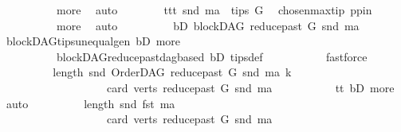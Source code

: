 \begin{isabellebody}
\ \ \ \ \ \ \ \ \ \ more\ \isamarkupfalse%
\ auto\isanewline
\ \ \ \ \ \ \isamarkupfalse%
\ ttt{\isacharcolon}{\kern0pt}\ {\isachardoublequoteopen}snd\ ma\ {\isasymin}\ tips\ G{\isachardoublequoteclose}\ \isamarkupfalse%
\ chosen{\isacharunderscore}{\kern0pt}max{\isacharunderscore}{\kern0pt}tip{\isacharparenleft}{\kern0pt}{}{\isacharparenright}{\kern0pt}\ pp{\isacharunderscore}{\kern0pt}in\isanewline
\ \ \ \ \ \ \ \ \ \ more\ \isamarkupfalse%
\ auto\isanewline
\ \ \ \ \ \ \isamarkupfalse%
\ \isamarkupfalse%
\ bD{}{\isacharcolon}{\kern0pt}\ {\isachardoublequoteopen}blockDAG\ {\isacharparenleft}{\kern0pt}reduce{\isacharunderscore}{\kern0pt}past\ G\ {\isacharparenleft}{\kern0pt}snd\ ma{\isacharparenright}{\kern0pt}{\isacharparenright}{\kern0pt}{\isachardoublequoteclose}\ \isamarkupfalse%
\ blockDAG{\isachardot}{\kern0pt}tips{\isacharunderscore}{\kern0pt}unequal{\isacharunderscore}{\kern0pt}gen\ bD\ more\ \isanewline
\ \ \ \ \ \ \ \ \ \ blockDAG{\isachardot}{\kern0pt}reduce{\isacharunderscore}{\kern0pt}past{\isacharunderscore}{\kern0pt}dagbased\ bD\ tips{\isacharunderscore}{\kern0pt}def\ \isanewline
\ \ \ \ \ \ \ \ \isamarkupfalse%
\ fastforce\isanewline
\ \ \ \ \ \ \isamarkupfalse%
\ \isamarkupfalse%
\ {\isachardoublequoteopen}length\ {\isacharparenleft}{\kern0pt}snd\ {\isacharparenleft}{\kern0pt}OrderDAG\ {\isacharparenleft}{\kern0pt}reduce{\isacharunderscore}{\kern0pt}past\ G\ {\isacharparenleft}{\kern0pt}snd\ ma{\isacharparenright}{\kern0pt}{\isacharparenright}{\kern0pt}\ k{\isacharparenright}{\kern0pt}{\isacharparenright}{\kern0pt}\ \isanewline
\ \ \ \ \ \ \ \ \ \ \ \ \ \ \ \ \ \ {\isacharequal}{\kern0pt}\ card\ {\isacharparenleft}{\kern0pt}verts\ {\isacharparenleft}{\kern0pt}reduce{\isacharunderscore}{\kern0pt}past\ G\ {\isacharparenleft}{\kern0pt}snd\ ma{\isacharparenright}{\kern0pt}{\isacharparenright}{\kern0pt}{\isacharparenright}{\kern0pt}{\isachardoublequoteclose}\isanewline
\ \ \ \ \ \ \ \ \isamarkupfalse%
\ {}\ tt\ bD{}\ more\ \isamarkupfalse%
\ auto\isanewline
\ \ \ \ \ \ \isamarkupfalse%
\ \isamarkupfalse%
\ {\isachardoublequoteopen}length\ {\isacharparenleft}{\kern0pt}snd\ {\isacharparenleft}{\kern0pt}fst\ ma{\isacharparenright}{\kern0pt}{\isacharparenright}{\kern0pt}\ \isanewline
\ \ \ \ \ \ \ \ \ \ \ \ \ \ \ \ \ \ {\isacharequal}{\kern0pt}\ card\ {\isacharparenleft}{\kern0pt}verts\ {\isacharparenleft}{\kern0pt}reduce{\isacharunderscore}{\kern0pt}past\ G\ {\isacharparenleft}{\kern0pt}snd\ ma{\isacharparenright}{\kern0pt}{\isacharparenright}{\kern0pt}{\isacharparenright}{\kern0pt}{\isachardoublequoteclose}\isanewline

\end{isabellebody}

